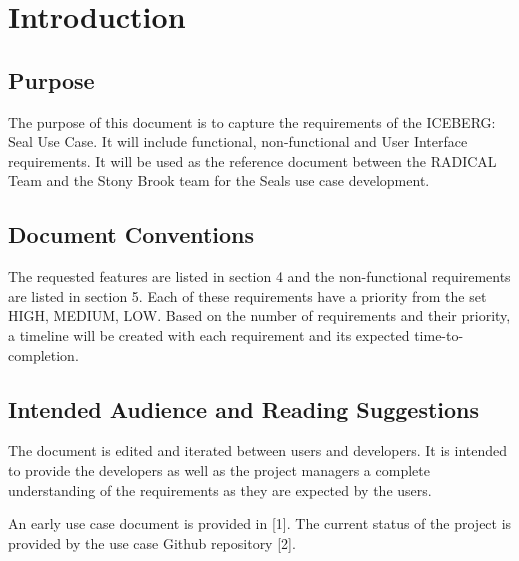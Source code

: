 \documentclass{scrreprt}
\begin{document}
\chapter{Introduction}

\section{Purpose}
The purpose of this document is to capture the requirements of the ICEBERG: Seal
Use Case. It will include functional, non-functional and User Interface requirements.
It will be used as the reference document between the RADICAL Team and the Stony 
Brook team for the Seals use case development.

\section{Document Conventions}
The requested features are listed in section 4 and the non-functional requirements are
listed in section 5. Each of these requirements have a priority from the set {HIGH,
MEDIUM, LOW}. Based on the number of requirements and their priority, a timeline
will be created with each requirement and its expected time-to-completion.

\section{Intended Audience and Reading Suggestions}

The document is edited and iterated between users and developers. It is intended
to provide the developers as well as the project managers a complete understanding 
of the requirements as they are expected by the users.

An early use case document is provided in [1]. The current status of the project 
is provided by the use case Github repository [2].
\end{document}
